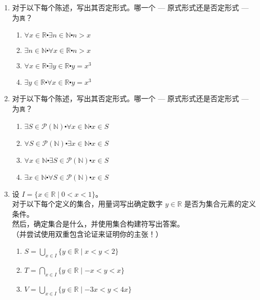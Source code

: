 \begin{enumerate}[label=(\arabic*)]
    \item 对于以下每个陈述，写出其否定形式。哪一个 --- 原式形式还是否定形式 --- 为\verb|真|？
        \begin{enumerate}[label=(\alph*)]
            \item $\forall x \in \mathbb{R} \centerdot \exists n \in \mathbb{N} \centerdot n > x$
            \item $\exists n \in \mathbb{N} \centerdot \forall x \in \mathbb{R} \centerdot n > x$
            \item $\forall x \in \mathbb{R} \centerdot \exists y \in \mathbb{R} \centerdot y = x^3$
            \item $\exists y \in \mathbb{R} \centerdot \forall x \in \mathbb{R} \centerdot y = x^3$
        \end{enumerate}
    \item 对于以下每个陈述，写出其否定形式。哪一个 --- 原式形式还是否定形式 --- 为\verb|真|？
        \begin{enumerate}[label=(\alph*)]
            \item $\exists S \in \mathcal{P}(\mathbb{N}) \centerdot \forall x \in \mathbb{N} \centerdot x \in S$
            \item $\forall S \in \mathcal{P}(\mathbb{N}) \centerdot \exists x \in \mathbb{N} \centerdot x \in S$
            \item $\forall x \in \mathbb{N} \centerdot \exists S \in \mathcal{P}(\mathbb{N}) \centerdot x \in S$
            \item $\exists x \in \mathbb{N} \centerdot \forall S \in \mathcal{P}(\mathbb{N}) \centerdot x \in S$
        \end{enumerate}
    \item 设 $I = \{x \in \mathbb{R} \mid 0 < x < 1\}$。\\
        对于以下每个定义的集合，用量词写出确定数字 $y \in \mathbb{R}$ 是否为集合元素的定义条件。\\
        然后，确定集合是什么，并使用集合构建符写出答案。\\
        （并尝试使用双重包含论证来证明你的主张！）
        \begin{enumerate}[label=(\alph*)]
            \item $\displaystyle{S =\bigcup_{x \in I}\{y \in \mathbb{R} \mid x < y < 2\}}$
            \item $\displaystyle{T =\bigcap_{x \in I}\{y \in \mathbb{R} \mid -x < y < x\}}$
            \item $\displaystyle{V =\bigcup_{x \in I}\{y \in \mathbb{R} \mid -3x < y < 4x\}}$

\end{enumerate}
\end{enumerate}
